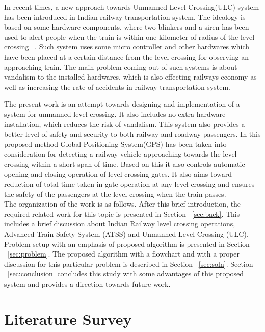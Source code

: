 \documentclass{llncs}
\begin{document}
In recent times, a new approach towards Unmanned Level Crossing(ULC) system has been introduced in Indian railway transportation system. The ideology is based on some hardware components, where two blinkers and a siren has been used to alert people when the train is within one kilometer of radius of the level crossing ~\cite{b2}. Such system uses some micro controller and other hardwares which have been placed at a certain distance from the level crossing for observing an approaching train. The main problem coming out of such systems is about vandalism to the installed hardwares, which is also effecting railways economy as well as increasing the rate of accidents in railway transportation system.

The present work is an attempt towards designing and implementation of a system for unmanned level crossing. It also includes no extra hardware installation, which reduces the risk of vandalism. This system also provides a better level of safety and security to both railway and roadway passengers. In this proposed method Global Positioning System(GPS) has been taken into consideration for detecting a railway vehicle approaching towards the level crossing within a short span of time. Based on this it also controls automatic opening and closing operation of level crossing gates. It also aims toward reduction of total time taken in gate operation at any level crossing and ensures the safety of the passengers at the level crossing when the train passes. \\

The organization of the work is as follows. After this brief introduction, the required related work for this topic is presented in Section ~\ref{sec:back}. This includes a brief discussion about Indian Railway level crossing operations, Advanced Train Safety System (ATSS) and Unmanned Level Crossing (ULC). Problem setup with an emphasis of proposed algorithm is presented in Section ~\ref{sec:problem}. The proposed algorithm with a flowchart and with a proper discussion for this particular problem is described in Section ~\ref{sec:soln}. Section ~\ref{sec:conclusion} concludes this study with some advantages of this proposed system and provides a direction towards future work.  
\\

\section{Literature Survey}\label{sec:Back}
\end{document}
